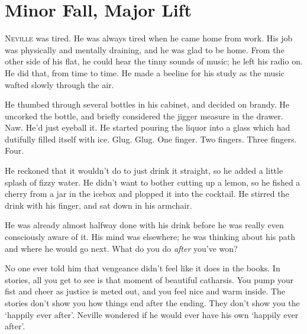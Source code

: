 \chapter{Minor Fall, Major Lift}


\lettrine{N}{eville} was tired. He was always tired when he came home from work. His job was physically and mentally draining, and he was glad to be home. From the other side of his flat, he could hear the tinny sounds of music; he left his radio on. He did that, from time to time. He made a beeline for his study as the music wafted slowly through the air.


He thumbed through several bottles in his cabinet, and decided on brandy. He uncorked the bottle, and briefly considered the jigger measure in the drawer. Naw. He’d just eyeball it. He started pouring the liquor into a glass which had dutifully filled itself with ice. Glug. Glug. One finger. Two fingers. Three fingers. Four.\SmallVSpace

He reckoned that it wouldn’t do to just drink it straight, so he added a little splash of fizzy water. He didn’t want to bother cutting up a lemon, so he fished a cherry from a jar in the icebox and plopped it into the cocktail. He stirred the drink with his finger, and sat down in his armchair.


He was already almost halfway done with his drink before he was really even consciously aware of it. His mind was elsewhere; he was thinking about his path and where he would go next. What do you do \textit{after} you’ve won?

No one ever told him that vengeance didn’t feel like it does in the books. In stories, all you get to see is that moment of beautiful catharsis. You pump your fist and cheer as justice is meted out, and you feel nice and warm inside. The stories don’t show you how things end after the ending. They don’t show you the ‘happily ever after’. Neville wondered if he would ever have his own ‘happily ever after’.

